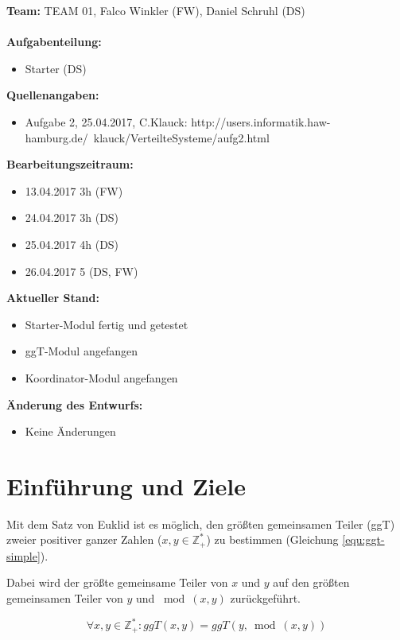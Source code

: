 \documentclass{article}
\begin{document}
\textbf{Team:} TEAM 01, Falco Winkler (FW), Daniel Schruhl (DS)\\
\\
\textbf{Aufgabenteilung:}
\begin{itemize}
    \item Starter (DS)
\end{itemize}

\textbf{Quellenangaben:}
\begin{itemize}
    \item Aufgabe 2, 25.04.2017, C.Klauck: \newline
    http://users.informatik.haw-hamburg.de/~klauck/VerteilteSysteme/aufg2.html
\end{itemize}

\textbf{Bearbeitungszeitraum:}
\begin{itemize}
	\item 13.04.2017 3h (FW)
	\item 24.04.2017 3h (DS)
	\item 25.04.2017 4h (DS)
	\item 26.04.2017 5 (DS, FW)
\end{itemize}

\textbf{Aktueller Stand:}
\begin{itemize}
	\item Starter-Modul fertig und getestet
	\item ggT-Modul angefangen
	\item Koordinator-Modul angefangen
\end{itemize}

\textbf{Änderung des Entwurfs:}
\begin{itemize}
    \item Keine Änderungen
\end{itemize}

\newpage

\section{Einführung und Ziele}
Mit dem Satz von Euklid ist es möglich, den größten gemeinsamen Teiler (ggT) zweier positiver ganzer Zahlen
($x,y \in \mathbb{Z}^{*}_{+}$) zu bestimmen (Gleichung \ref{equ:ggt-simple}).

Dabei wird der größte gemeinsame Teiler von $x$ und $y$ auf den größten gemeinsamen Teiler von $y$ und $\bmod{(x,y)}$
zurückgeführt.

\begin{equation}
\forall x,y \in \mathbb{Z}^{*}_{+}: ggT(x,y) = ggT(y,\bmod{(x,y)})
\label{equ:ggt-simple}
\end{equation}
\end{document}
